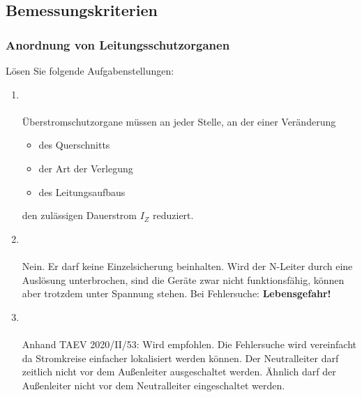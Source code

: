 \subsection{Bemessungskriterien}
\subsubsection{Anordnung von Leitungsschutzorganen}

Lösen Sie folgende Aufgabenstellungen:
\begin{enumerate}
    \item   {}\\\\
            Überstromschutzorgane müssen an jeder Stelle, an der einer Veränderung
            \begin{itemize}
                \item des Querschnitts
                \item der Art der Verlegung 
                \item des Leitungsaufbaus
            \end{itemize}
            den zulässigen Dauerstrom $I_Z$ reduziert.

    \item   {} \\\\
            Nein. Er darf keine Einzelsicherung beinhalten. Wird der N-Leiter durch eine Auslösung unterbrochen, sind die Geräte zwar nicht funktionsfähig, 
            können aber trotzdem unter Spannung stehen. Bei Fehlersuche: \textbf{Lebensgefahr!}

    \item   {} \\\\
            Anhand TAEV 2020/II/53: Wird empfohlen. Die Fehlersuche wird vereinfacht da Stromkreise einfacher lokalisiert werden können. Der Neutralleiter darf zeitlich nicht vor dem Außenleiter ausgeschaltet werden.
            Ähnlich darf der Außenleiter nicht vor dem Neutralleiter eingeschaltet werden.
            

\end{enumerate}
